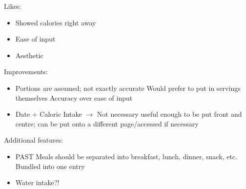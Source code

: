 \documentclass[12pt, titlepage]{article}
\begin{document}
	Likes:
	\begin{itemize}
		\item Showed calories right away
		\item Ease of input
		\item Aesthetic
	\end{itemize}
	Improvements:
	\begin{itemize}
		\item Portions are assumed; not exactly accurate
		\subitem Would prefer to put in servings themselves
		\subitem Accuracy over ease of input
		\item Date + Caloric Intake $\rightarrow$ Not necessary useful enough to be put front and centre; can be
		put onto a different page/accessed if necessary
	\end{itemize}
	Additional features:
	\begin{itemize}
		\item PAST Meals should be separated into breakfast, lunch, dinner, snack, etc.
		\subitem Bundled into one entry
		\item Water intake?!
	\end{itemize}
\end{document}
